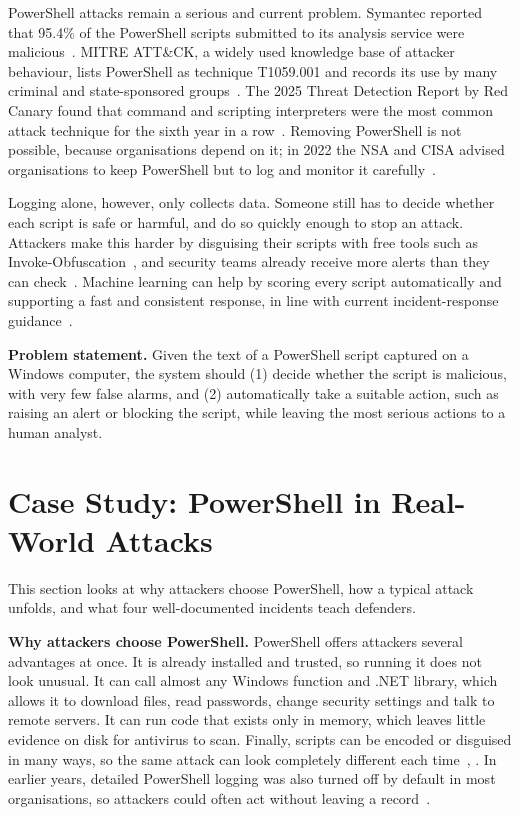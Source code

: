 \documentclass[12pt,a4paper]{article}
\newcommand{\attck}{ATT\&CK}
\newcommand{\head}[1]{\noindent\textbf{#1}\quad}
\begin{document}
PowerShell attacks remain a serious and current problem. Symantec reported that 95.4\% of the PowerShell scripts submitted to its analysis service were malicious~\cite{wueest2016}. MITRE \attck{}, a widely used knowledge base of attacker behaviour, lists PowerShell as technique T1059.001 and records its use by many criminal and state-sponsored groups~\cite{mitre_t1059}. The 2025 Threat Detection Report by Red Canary found that command and scripting interpreters were the most common attack technique for the sixth year in a row~\cite{redcanary2025}. Removing PowerShell is not possible, because organisations depend on it; in 2022 the NSA and CISA advised organisations to keep PowerShell but to log and monitor it carefully~\cite{nsa2022}.

Logging alone, however, only collects data. Someone still has to decide whether each script is safe or harmful, and do so quickly enough to stop an attack. Attackers make this harder by disguising their scripts with free tools such as Invoke-Obfuscation~\cite{bohannon2016}, and security teams already receive more alerts than they can check~\cite{hassan2019}. Machine learning can help by scoring every script automatically and supporting a fast and consistent response, in line with current incident-response guidance~\cite{nist2025}.

\head{Problem statement.} Given the text of a PowerShell script captured on a Windows computer, the system should (1) decide whether the script is malicious, with very few false alarms, and (2) automatically take a suitable action, such as raising an alert or blocking the script, while leaving the most serious actions to a human analyst.

\section{Case Study: PowerShell in Real-World Attacks}
This section looks at why attackers choose PowerShell, how a typical attack unfolds, and what four well-documented incidents teach defenders.

\head{Why attackers choose PowerShell.} PowerShell offers attackers several advantages at once. It is already installed and trusted, so running it does not look unusual. It can call almost any Windows function and .NET library, which allows it to download files, read passwords, change security settings and talk to remote servers. It can run code that exists only in memory, which leaves little evidence on disk for antivirus to scan. Finally, scripts can be encoded or disguised in many ways, so the same attack can look completely different each time~\cite{wueest2016}, \cite{bohannon2016}. In earlier years, detailed PowerShell logging was also turned off by default in most organisations, so attackers could often act without leaving a record~\cite{wueest2016}.
\end{document}
